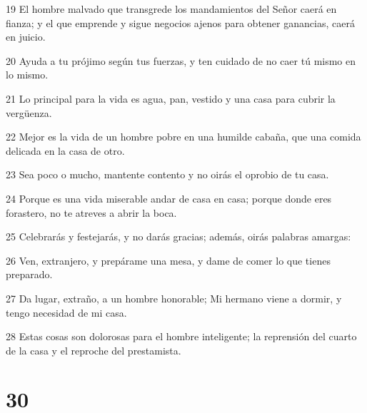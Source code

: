 \par 19 El hombre malvado que transgrede los mandamientos del Señor caerá en fianza; y el que emprende y sigue negocios ajenos para obtener ganancias, caerá en juicio.
\par 20 Ayuda a tu prójimo según tus fuerzas, y ten cuidado de no caer tú mismo en lo mismo.
\par 21 Lo principal para la vida es agua, pan, vestido y una casa para cubrir la vergüenza.
\par 22 Mejor es la vida de un hombre pobre en una humilde cabaña, que una comida delicada en la casa de otro.
\par 23 Sea poco o mucho, mantente contento y no oirás el oprobio de tu casa.
\par 24 Porque es una vida miserable andar de casa en casa; porque donde eres forastero, no te atreves a abrir la boca.
\par 25 Celebrarás y festejarás, y no darás gracias; además, oirás palabras amargas:
\par 26 Ven, extranjero, y prepárame una mesa, y dame de comer lo que tienes preparado.
\par 27 Da lugar, extraño, a un hombre honorable; Mi hermano viene a dormir, y tengo necesidad de mi casa.
\par 28 Estas cosas son dolorosas para el hombre inteligente; la reprensión del cuarto de la casa y el reproche del prestamista.

\chapter{30}


